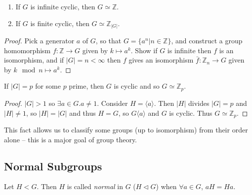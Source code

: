 \documentclass{article}
\begin{document}
\begin{prop}
\begin{enumerate}
  \item{If $G$ is infinite cyclic, then $G \simeq \mathbb{Z}$.}
  \item{If $G$ is finite cyclic, then $G \simeq \mathbb{Z}_{|G|}$.}
\end{enumerate}
\end{prop}
\begin{proof}
Pick a generator $a$ of $G$, so that 
$G = \{ a^n | n \in \mathbb{Z} \}$, and construct a group homomorphism
$f : \mathbb{Z} \to G$ given by $k \mapsto a^k$. Show if $G$ is
infinite then $f$ is an isomorphism, and if $|G| = n < \infty$ then
$f$ gives an isomorphism $\bar{f} : \mathbb{Z}_n \to G$ given by
$k \mod n \mapsto a^k$.
\end{proof}

\begin{prop}
If $|G| = p$ for some $p$ prime, then $G$ is cyclic and so 
$G \simeq \mathbb{Z}_p$.
\end{prop}
\begin{proof}
$|G| > 1$ so $\exists a \in G. a \neq 1$. Consider 
$H = \langle a \rangle$. Then $|H|$ divides $|G| = p$ and 
$|H| \neq 1$, so $|H| = |G|$ and thus $H = G$, so 
$G \langle a \rangle$ and $G$ is cyclic. Thus $G \simeq \mathbb{Z}_p$.
\end{proof}

This fact allows us to classify some groups (up to isomorphism) from
their order alone -- this is a major goal of group theory.

\subsection{Normal Subgroups}

\begin{defn}
Let $H < G$. Then $H$ is called \emph{normal} in $G$ 
($H \triangleleft G$) when $\forall a \in G$, $aH = Ha$. 
\end{defn}
\end{document}

